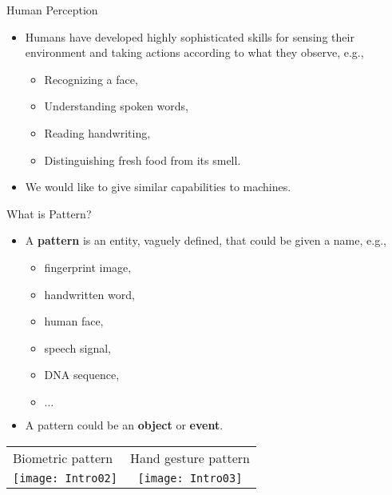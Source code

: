 \begin{frame}{Human Perception}
\begin{itemize}
\setlength{\itemsep}{20pt}
\item Humans have developed highly sophisticated skills for
sensing their environment and taking actions according to
what they observe, e.g.,
\begin{itemize}
\setlength{\itemsep}{5pt}
\item Recognizing a face,
\vspace{1.5cm}
\item Understanding spoken words,
\item Reading handwriting,
\vspace{1cm}
\item Distinguishing fresh food from its smell.
\end{itemize}
\item We would like to give similar capabilities to machines.
\end{itemize}

\end{frame}

\begin{frame}{What is Pattern?}
\begin{itemize}
\item A \textbf{\color{mycolor2}pattern} is an entity, vaguely defined, that could be given a name, e.g.,
\begin{itemize}
\item fingerprint image,
\item handwritten word,
\item human face,
\item speech signal,
\item DNA sequence,
\item $\ldots$
\end{itemize}
\item A pattern could be an \textbf{\color{mycolor2}object} or \textbf{\color{mycolor2}event}.
\end{itemize}
\begin{table}
\centering
\begin{tabular}{lc}
Biometric pattern & Hand gesture pattern  \\
\texttt{[image: Intro02]} & \texttt{[image: Intro03]} \\
\end{tabular}
\end{table}
\end{frame}

